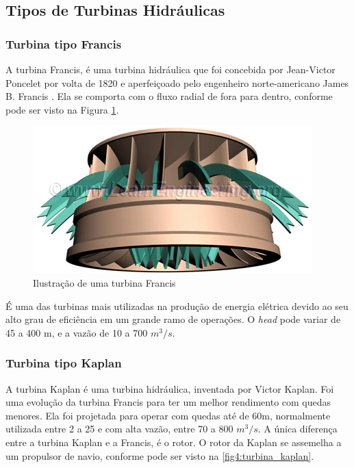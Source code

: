\subsection{Tipos de Turbinas Hidráulicas}

\subsubsection{Turbina tipo Francis}

A turbina Francis, é uma turbina hidráulica que foi concebida por Jean-Victor Poncelet por volta de 1820 e aperfeiçoado pelo engenheiro norte-americano James B. Francis \cite{turbina_francis}. Ela se comporta com o fluxo radial de fora para dentro, conforme pode ser visto na Figura \ref{fig3:turbina_francis}.

    \begin{figure}[htb]
        \centering
        \caption {\label{fig3:turbina_francis} Ilustração de uma turbina Francis}
        \includegraphics[scale=0.8]{images/fig3.png}
    \end{figure}

    É uma das turbinas mais utilizadas na produção de energia elétrica devido ao seu alto grau de eficiência em um grande ramo de operações. O \textit{head} pode variar de 45 a 400 m, e a vazão de 10 a 700 $m^3/s$. \cite{francis_turbine}

\subsubsection{Turbina tipo Kaplan}

    A turbina Kaplan é uma turbina hidráulica, inventada por Victor Kaplan. Foi uma evolução da turbina Francis para ter um melhor rendimento com quedas menores. Ela foi projetada para operar com quedas até de 60m, normalmente utilizada entre 2 a 25 e com alta vazão, entre 70 a 800 $m^3/s$. A única diferença entre a turbina Kaplan e a Francis, é o rotor. O rotor da Kaplan se assemelha a um propulsor de navio, conforme pode ser visto na  \autoref{fig4:turbina_kaplan}.

